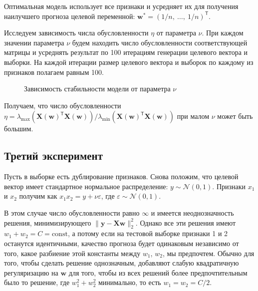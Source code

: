 \documentclass[12pt, twoside]{article}
\newcommand{\by}{\mathbf{y}}
\newcommand{\bw}{\mathbf{w}}
\newcommand{\bX}{\mathbf{X}}
\newcommand{\cN}{\mathcal{N}}
\newcommand{\getT}{^{\mathsf{T}}}
\begin{document}
Оптимальная модель использует все признаки и усредняет их для получения наилучшего прогноза целевой переменной: $\bw^* = (1 / n,\:\ldots,\:1 / n)\getT$.

Исследуем зависимость числа обусловленности $\eta$ от параметра $\nu$. При каждом значении параметра $\nu$ будем находить число обусловленности соответствующей матрицы и усреднять результат по 100 итерациям генерации целевого вектора и выборки. На каждой итерации размер целевого вектора и выборок по каждому из признаков полагаем равным 100.

\begin{figure}[htb]
\caption{Зависимость стабильности модели от параметра $\nu$}
\label{first_exp}
\end{figure}

Получаем, что число обусловленности $\eta = \lambda_{\max}(\bX(\bw)\getT\bX(\bw)) / \lambda_{\min}(\bX(\bw)\getT\bX(\bw))$ при малом $\nu$ может быть большим.


\subsection{Третий эксперимент}

Пусть в выборке есть дублирование признаков. Снова положим, что целевой вектор имеет стандартное нормальное распределение: $y \sim \cN(0, 1)$. Признаки $x_1$ и $x_2$ получим как $x_1 x_2 = y + \nu \varepsilon$, где $\varepsilon \sim \cN(0, 1)$.

В этом случае число обусловленности равно $\infty$ и имеется неоднозначность решения, минимизирующего $\|\by - \bX \bw\|_2^2$. Однако все эти решения имеют $w_1 + w_2 = C = \mathrm{const}$, а потому если на тестовой выборке признаки 1 и 2 останутся идентичными, качество прогноза будет одинаковым независимо от того, какое разбиение этой константы между $w_1$, $w_2$, мы предпочтем. Обычно для того, чтобы сделать решение однозначным, добавляют слабую квадратичную регуляризацию на $\bw$ для того, чтобы из всех решений более предпочтительным было то решение, где $w_1^2 + w_2^2$ минимально, то есть $w_1 = w_2 = C / 2$. 
\end{document}
